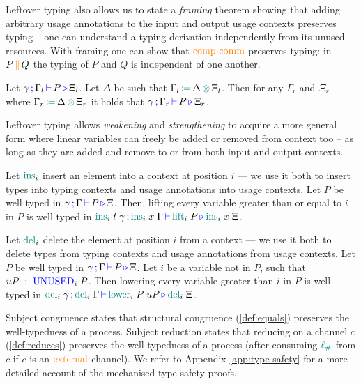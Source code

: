 \documentclass[runningheads]{llncs}
\newcommand{\type}[1]{\textcolor{blue}{\operatorname{#1}}}
\newcommand{\constr}[1]{\textcolor{orange}{\operatorname{#1}}}
\newcommand{\func}[1]{\textcolor{teal}{\operatorname{#1}}}
\newcommand{\comp}[2]{#1 \, \constr{\parallel} \, #2}
\newcommand{\opctx}[3]{#1 \, \func{\coloneqq} \, #2 \, \func{\otimes} \, #3}
\newcommand{\lio}{\func{\ell_{\#}}}
\newcommand{\types}[4]{#1 \, \type{;} \, #2 \, \type{\vdash} \, #3 \, \type{\triangleright} \, #4}
\newcommand{\Unused}{\type{UNUSED}}
\begin{document}
Leftover typing also allows us to state a \emph{framing} theorem showing that adding arbitrary usage annotations to the input and output usage contexts preserves typing -- one can understand a typing derivation independently from its unused resources.
With framing one can show that $\constr{comp-comm}$ preserves typing: in $\comp{P}{Q}$ the typing of $P$ and $Q$ is independent of one another.
\begin{nitheorem}[Framing]
  \label{thm:framing}
  Let $\types{\gamma}{\Gamma_l}{P}{\Xi_l}$.
  Let $\Delta$ be such that $\opctx{\Gamma_l}{\Delta}{\Xi_l}$.
  Then for any $\Gamma_r$ and $\Xi_r$ where $\opctx{\Gamma_r}{\Delta}{\Xi_r}$ it holds that $\types{\gamma}{\Gamma_r}{P}{\Xi_r}$.
\end{nitheorem}

Leftover typing allows \emph{weakening} and \emph{strengthening} to acquire a more general form where linear variables can freely be added or removed from context too -- as long as they are added and remove to or from both input and output contexts.

\begin{nitheorem}[Weakening]
  \label{thm:weakening}
  Let $\func{ins}_i$ insert an element into a context at position $i$ --- we use it both to insert types into typing contexts and usage annotations into usage contexts.
  Let $P$ be well typed in $\types{\gamma}{\Gamma}{P}{\Xi}$.
  Then, lifting every variable greater than or equal to $i$ in $P$ is well typed in
  $\types{\func{ins}_i \; t \; \gamma}{\func{ins}_i \; x \; \Gamma}{\func{lift}_i \; P}{\func{ins}_i \; x \; \Xi}$.
\end{nitheorem}

\begin{nitheorem}[Strengthening]
  \label{thm:strengthening} 
  Let $\func{del}_i$ delete the element at position $i$ from a context --- we use it both to delete types from typing contexts and usage annotations from usage contexts.
  Let $P$ be well typed in $\types{\gamma}{\Gamma}{P}{\Xi}$.
  Let $i$ be a variable not in $P$, such that $uP \; : \; \Unused_i \; P$.
  Then lowering every variable greater than $i$ in $P$ is well typed in $\types{\func{del}_i \; \gamma}{\func{del}_i \; \Gamma}{\func{lower}_i \; P \; uP}{\func{del}_i \; \Xi}$.
\end{nitheorem}

Subject congruence states that structural congruence (\autoref{def:equals}) preserves the well-typedness of a process.
Subject reduction states that reducing on a channel $c$ (\autoref{def:reduces}) preserves the well-typedness of a process (after consuming $\lio$ from $c$ if $c$ is an $\constr{external}$ channel).
We refer to Appendix \ref{app:type-safety} for a more detailed account of the mechanised type-safety proofs.
\end{document}
